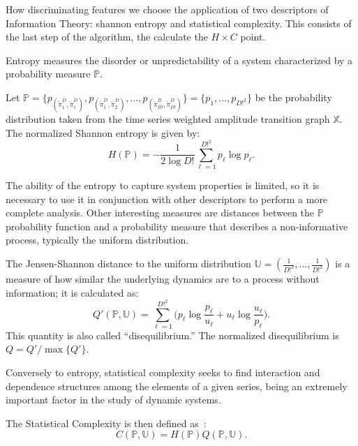 \documentclass[journal]{IEEEtran}
\begin{document}
	How discriminating features we choose the application of two descriptors of Information Theory: shannon entropy and statistical complexity.
	This consists of the last step of the algorithm, the calculate the $H \times C$ point.
	
	Entropy measures the disorder or unpredictability of a system characterized by a probability measure $\mathbb{P}$.
	
	Let $\mathbb{P} = \{p_{(\widetilde\pi^D_1, \widetilde\pi^D_1)}, p_{(\widetilde\pi^D_1, \widetilde\pi^D_2)}, \dots, p_{(\widetilde\pi^D_{D!}, \widetilde\pi^D_{D!})} \} = \{p_1,\dots,p_{D!^2}\}$ be the probability distribution taken from the time series weighted amplitude transition graph $\mathbb{X}$.
	The normalized Shannon entropy is given by:	
	\begin{equation}
		H(\mathbb{P}) = -\frac1{2\log D!}\sum_{\ell=1}^{D!^2} p_{\ell} \log p_{\ell} .
		\label{eq:Entropia}
	\end{equation}
	
	The ability of the entropy to capture system properties is limited, so it is necessary to use it in conjunction with other des\-criptors to perform a more complete analysis.
	Other interesting measures are distances between the $\mathbb{P}$ probability function and a probability measure that describes a non-informative process, typically the uniform distribution.
	
	The Jensen-Shannon distance to the uniform distribution $\mathbb{U} = (\frac{1}{D!^2}, \dots, \frac{1}{D!^2})$ is a measure of how similar the underlying dynamics are to a process without information; it is calculated as:
	\begin{equation}
		Q'(\mathbb{P}, \mathbb{U}) = \sum_{\ell=1}^{D!^2} \Big(p_\ell \log\frac{p_\ell}{u_\ell} +
		u_\ell \log\frac{u_\ell}{p_\ell}
		\Big).
	\end{equation}
	This quantity is also called ``disequilibrium.''
	The normalized disequilibrium is $ Q=Q'/\max\{Q'\}$.
	
	Conversely to entropy, statistical complexity seeks to find interaction and dependence structures among the elements of a given series, being an extremely important factor in the study of dynamic systems.
	
	The Statistical Complexity is then defined as~\cite{Lamberti2004}:
	\begin{equation}
		C(\mathbb{P}, \mathbb{U}) = H(\mathbb{P}) Q(\mathbb{P}, \mathbb{U}).
	\end{equation}
	
\end{document}
